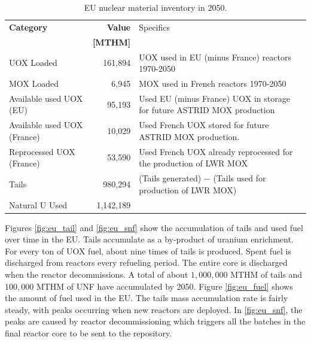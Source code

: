 \begin{table}[h]
    \centering
        \caption{\gls{EU} nuclear material inventory in 2050.}
\begin{tabularx}{\textwidth}{XrX}
            \hline
                        \textbf{Category} & \textbf{Value} & Specifics \\
                                          & \textbf{[MTHM]} & \\ \hline
                        UOX Loaded  & 161,894 & UOX used in EU (minus France) reactors 1970-2050\\ 
            MOX Loaded  & 6,945  & MOX used in French reactors 1970-2050\\
                        Available used UOX (EU)  & 95,193  & Used EU (minus France) 
                                UOX in storage for future ASTRID MOX 
                                production\\
                        Available used UOX (France) & 
                                10,029  & Used French UOX stored for 
                                future ASTRID MOX production. \\
                                Reprocessed UOX (France) & 53,590 & Used French UOX already reprocessed for the production of LWR MOX \\
            Tails  & 980,294  & (Tails generated) $-$ (Tails used for production of LWR MOX) \\ 
            Natural U Used  & 1,142,189  & \\ \hline
        \end{tabularx}
        
        \label{tab:sim_result1}
\end {table}
\FloatBarrier


Figures \ref{fig:eu_tail} and \ref{fig:eu_snf} show the 
accumulation of tails and used fuel over time in the \gls{EU}.
Tails accumulate as a by-product of uranium enrichment. For every
ton of \gls{UOX} fuel, about nine times of tails is produced. 
Spent fuel is discharged from reactors every refueling period.
The entire core is discharged when the reactor decommissions.
A total of about $1,000,000$ MTHM of tails and $100,000$ MTHM of
\gls{UNF} have accumulated by 2050.
Figure \ref{fig:eu_fuel} shows the amount of fuel used in the \gls{EU}. The 
tails mass accumulation rate is fairly steady, with peaks occurring when new 
reactors are deployed.
In \cref{fig:eu_snf}, the peaks are caused by reactor decommissioning which 
triggers all the batches in the final reactor core to be sent to the repository.


